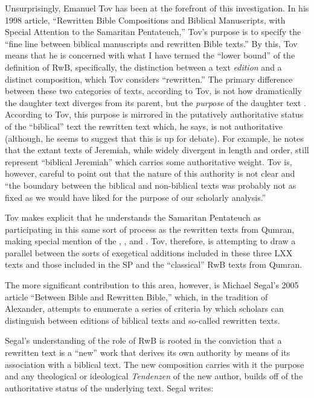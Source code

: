  Unsurprisingly, Emanuel Tov has been at the forefront of this investigation. In his 1998 article, ``Rewritten Bible Compositions and Biblical Manuscripts, with Special Attention to the Samaritan Pentateuch,'' Tov's purpose is to specify the ``fine line between biblical manuscripts and rewritten Bible texts.''\autocite[334]{tov_dsd1998} By this, Tov means that he is concerned with what I have termed the ``lower bound'' of the definition of RwB, specifically, the distinction between a text \emph{edition} and a distinct composition, which Tov considers ``rewritten.'' The primary difference between these two categories of texts, according to Tov, is not how dramatically the daughter text diverges from its parent, but the \emph{purpose} of the daughter text \autocite[334]{tov_dsd1998}. According to Tov, this purpose is mirrored in the putatively authoritative status of the ``biblical'' text \visavis the rewritten text which, he says, is not authoritative (although, he seems to suggest that this is up for debate\autocite[337]{tov_dsd1998}). For example, he notes that the extant texts of Jeremiah, while widely divergent in length and order, still represent ``biblical Jeremiah'' which carries some authoritative weight. Tov is, however, careful to point out that the nature of this authority is not clear and ``the boundary between the biblical and non-biblical texts was probably not as fixed as we would have liked for the purpose of our scholarly analysis.''\autocite[335]{tov_dsd1998} 

 Tov makes explicit that he understands the Samaritan Pentateuch as participating in this same sort of process as the rewritten texts from Qumran, making special mention of the \templescroll, \ga, and \jub. Tov, therefore, is attempting to draw a parallel between the sorts of exegetical additions included in these three LXX texts and those included in the SP and the ``classical'' RwB texts from Qumran. 

 The more significant contribution to this area, however, is Michael Segal's 2005 article ``Between Bible and Rewritten Bible,'' which, in the tradition of Alexander, attempts to enumerate a series of criteria by which scholars can distinguish between editions of biblical texts and so-called rewritten texts. 

 Segal's understanding of the role of RwB is rooted in the conviction that a rewritten text is a ``new'' work that derives its own authority by means of its association with a biblical text. The new composition carries with it the purpose and any theological or ideological \emph{Tendenzen} of the new author, builds off of the authoritative status of the underlying text.\autocite[11]{segal_henze2005} Segal writes: 


